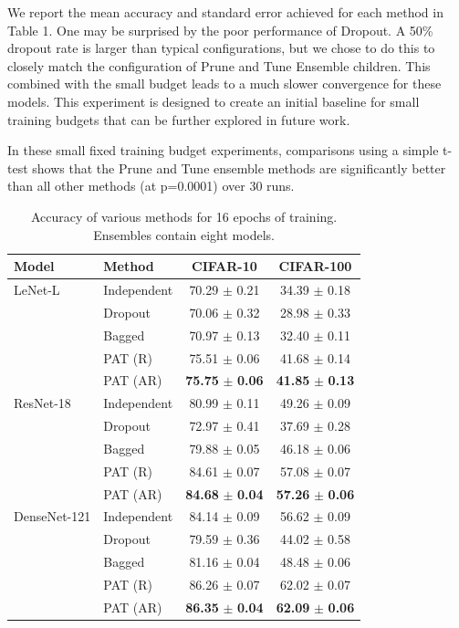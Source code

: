 \documentclass[letterpaper]{article} %
\begin{document}
We report the mean accuracy and standard error achieved for each method in Table 1. One may be surprised by the poor performance of Dropout. A 50\% dropout rate is larger than typical configurations, but we chose to do this to closely match the configuration of Prune and Tune Ensemble children. This combined with the small budget leads to a much slower convergence for these models. This experiment is designed to create an initial baseline for small training budgets that can be further explored in future work.

In these small fixed training budget experiments, comparisons using a simple t-test shows that the Prune and Tune ensemble methods are significantly better than all other methods (at p=0.0001) over 30 runs.

\begin{table}[t]
\small

\begin{tabularx}{\columnwidth}{l X c c}
\toprule
Model & Method & CIFAR-10 & CIFAR-100 \\
\midrule
LeNet-L  & Independent & 70.29 $\pm$ 0.21 & 34.39 $\pm$ 0.18 \\
        & Dropout & 70.06 $\pm$ 0.32  & 28.98 $\pm$ 0.33 \\
        & Bagged & 70.97 $\pm$ 0.13  & 32.40 $\pm$ 0.11 \\
        & PAT (R) & 75.51 $\pm$ 0.06  & 41.68 $\pm$ 0.14 \\
        & PAT (AR) & \textbf{75.75} $\pm$ \textbf{0.06} & \textbf{41.85} $\pm$ \textbf{0.13} \\
\midrule
ResNet-18 & Independent & 80.99 $\pm$ 0.11 & 49.26 $\pm$ 0.09 \\
        & Dropout & 72.97 $\pm$ 0.41 & 37.69 $\pm$ 0.28 \\
        & Bagged & 79.88 $\pm$ 0.05 & 46.18 $\pm$ 0.06 \\
        & PAT (R) & 84.61 $\pm$ 0.07  & 57.08 $\pm$ 0.07 \\
        & PAT (AR) & \textbf{84.68} $\pm$ \textbf{0.04} & \textbf{57.26} $\pm$ \textbf{0.06} \\
\midrule
DenseNet-121 & Independent & 84.14 $\pm$ 0.09 & 56.62 $\pm$ 0.09 \\
          & Dropout & 79.59 $\pm$ 0.36 & 44.02 $\pm$ 0.58 \\
          & Bagged & 81.16 $\pm$ 0.04 & 48.48 $\pm$ 0.06 \\
          & PAT (R) & 86.26 $\pm$ 0.07  & 62.02 $\pm$ 0.07 \\
            & PAT (AR) & \textbf{86.35} $\pm$ \textbf{0.04} & \textbf{62.09} $\pm$ \textbf{0.06} \\
\bottomrule
\end{tabularx}

\caption{Accuracy of various methods for 16 epochs of training. Ensembles contain eight models.}\label{tab:low-budget-table}
\end{table}
\end{document}
